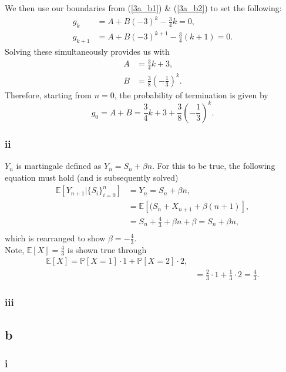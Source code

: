\documentclass{article}
\begin{document}
We then use our boundaries from (\ref{3a_b1}) \& (\ref{3a_b2}) to set the following:
\begin{align}
    g_k &= A+B(-3)^k - \frac{3}{4}k = 0,\\
    g_{k+1} &= A+B(-3)^{k+1} - \frac{3}{4}(k+1) = 0.
\end{align}
Solving these simultaneously provides us with
\begin{align}
    A &= \frac{3}{4}k + 3,\\
    B &= \frac{3}{8}\left(-\frac{1}{3}\right)^{k}. 
\end{align}
Therefore, starting from $n=0$, the probability of termination is given by
\begin{equation}
    g_0 = A+B = \frac{3}{4}k+3+\frac{3}{8}\left( -\frac{1}{3} \right)^k.
\end{equation}

\subsubsection{ii}
$Y_n$ is martingale defined as $Y_n = S_n +\beta n$. For this to be true, the following equation must hold (and is subsequently solved)
\begin{align}
     \mathbb{E}[Y_{n+1}\vert\{S_i\}_{i=0}^n] &= Y_n = S_n+\beta n,\\
     &=  \mathbb{E}[(S_n+X_{n+1} + \beta(n+1)],\\
     &= S_n + \frac{4}{3} + \beta n + \beta = S_n+\beta n,\\
\end{align}
which is rearranged to show $\beta=-\frac{4}{3}$.\\
Note, $ \mathbb{E}[X] = \frac{4}{3}$ is shown true through
\begin{align}
     \mathbb{E}[X] = \mathbb{P}[X=1]\cdot  1 + \mathbb{P}[X=2] \cdot 2,\\
     &= \frac{2}{3}\cdot 1 + \frac{1}{3}\cdot 2 = \frac{4}{3}.
\end{align}
\subsubsection{iii}


\subsection{b}
\subsubsection{i}
\end{document}
